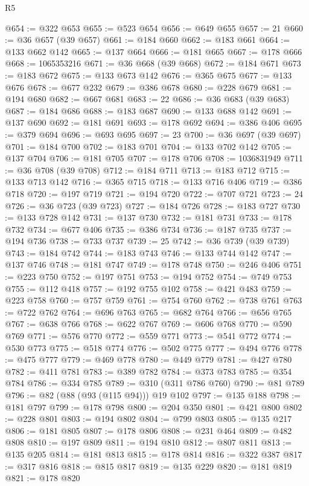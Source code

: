 \begin{lexlean}{R5}
\begin{coremodule}
@654 := @322 @653
@655 := @523 @654
@656 := @649 @655
@657 := 21
@660 := @36 @657 (@39 @657)
@661 := @184 @660
@662 := @183 @661
@664 := @133 @662 @142
@665 := @137 @664
@666 := @181 @665
@667 := @178 @666
@668 := 1065353216
@671 := @36 @668 (@39 @668)
@672 := @184 @671
@673 := @183 @672
@675 := @133 @673 @142
@676 := @365 @675
@677 := @133 @676
@678 := @677 @232
@679 := @386 @678
@680 := @228 @679
@681 := @194 @680
@682 := @667 @681
@683 := 22
@686 := @36 @683 (@39 @683)
@687 := @184 @686
@688 := @183 @687
@690 := @133 @688 @142
@691 := @137 @690
@692 := @181 @691
@693 := @178 @692
@694 := @386 @406
@695 := @379 @694
@696 := @693 @695
@697 := 23
@700 := @36 @697 (@39 @697)
@701 := @184 @700
@702 := @183 @701
@704 := @133 @702 @142
@705 := @137 @704
@706 := @181 @705
@707 := @178 @706
@708 := 1036831949
@711 := @36 @708 (@39 @708)
@712 := @184 @711
@713 := @183 @712
@715 := @133 @713 @142
@716 := @365 @715
@718 := @133 @716 @406
@719 := @386 @718
@720 := @197 @719
@721 := @194 @720
@722 := @707 @721
@723 := 24
@726 := @36 @723 (@39 @723)
@727 := @184 @726
@728 := @183 @727
@730 := @133 @728 @142
@731 := @137 @730
@732 := @181 @731
@733 := @178 @732
@734 := @677 @406
@735 := @386 @734
@736 := @187 @735
@737 := @194 @736
@738 := @733 @737
@739 := 25
@742 := @36 @739 (@39 @739)
@743 := @184 @742
@744 := @183 @743
@746 := @133 @744 @142
@747 := @137 @746
@748 := @181 @747
@749 := @178 @748
@750 := @246 @406
@751 := @223 @750
@752 := @197 @751
@753 := @194 @752
@754 := @749 @753
@755 := @112 @418
@757 := @192 @755 @102
@758 := @421 @483
@759 := @223 @758
@760 := @757 @759
@761 := @754 @760
@762 := @738 @761
@763 := @722 @762
@764 := @696 @763
@765 := @682 @764
@766 := @656 @765
@767 := @638 @766
@768 := @622 @767
@769 := @606 @768
@770 := @590 @769
@771 := @576 @770
@772 := @559 @771
@773 := @541 @772
@774 := @530 @773
@775 := @518 @774
@776 := @502 @775
@777 := @494 @776
@778 := @475 @777
@779 := @469 @778
@780 := @449 @779
@781 := @427 @780
@782 := @411 @781
@783 := @389 @782
@784 := @373 @783
@785 := @354 @784
@786 := @334 @785
@789 := @310 (@311 @786 @760)
@790 := @81 @789
@796 := @82 (@88 (@93 (@115 @94))) @19 @102
@797 := @135 @188
@798 := @181 @797
@799 := @178 @798
@800 := @204 @350
@801 := @421 @800
@802 := @228 @801
@803 := @194 @802
@804 := @799 @803
@805 := @135 @217
@806 := @181 @805
@807 := @178 @806
@808 := @231 @464
@809 := @482 @808
@810 := @197 @809
@811 := @194 @810
@812 := @807 @811
@813 := @135 @205
@814 := @181 @813
@815 := @178 @814
@816 := @322 @387
@817 := @317 @816
@818 := @815 @817
@819 := @135 @229
@820 := @181 @819
@821 := @178 @820

\end{coremodule}
\end{lexlean}
